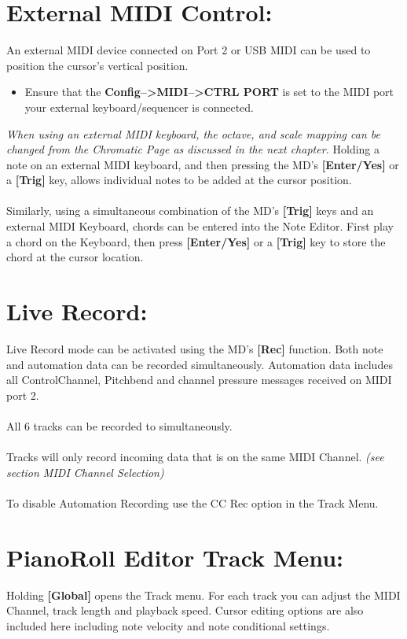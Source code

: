 \section{External MIDI Control:}
An external MIDI device connected on Port 2 or USB MIDI can be used to position the cursor's vertical position.
\begin{itemize}
    \item Ensure that the \textbf{Config-->MIDI-->CTRL PORT} is set to the MIDI port your external keyboard/sequencer is connected.
\end{itemize}
\textit{When using an external MIDI keyboard, the octave, and scale mapping can be changed from the Chromatic Page as discussed in the next chapter.}
Holding a note on an external MIDI keyboard, and then pressing the MD's \textbf{[Enter/Yes]} or a \textbf{[Trig]} key, allows individual notes to  be added at the cursor position.
\\\\
Similarly, using a simultaneous combination of the MD's \textbf{[Trig]} keys and an external MIDI Keyboard, chords can be entered into the Note Editor. First play a chord on the Keyboard, then press \textbf{[Enter/Yes]} or a \textbf{[Trig]} key to store the chord at the cursor location.
\section{Live Record:}
Live Record mode can be activated using the MD's \textbf{[Rec]} function. Both note and automation data can be recorded simultaneously. Automation data includes all ControlChannel, Pitchbend and channel pressure messages received on MIDI port 2.\\\\All 6 tracks can be recorded to simultaneously.\\
\\Tracks will only record incoming data that is on the same MIDI Channel. \textit{(see section MIDI Channel Selection)}\\\\
To disable Automation Recording use the CC Rec option in the Track Menu.
\section{PianoRoll Editor Track Menu:}
Holding \textbf{[Global]} opens the Track menu. For each track you can adjust the MIDI Channel, track length and playback speed. Cursor editing options are also included here including note velocity and note conditional settings.

